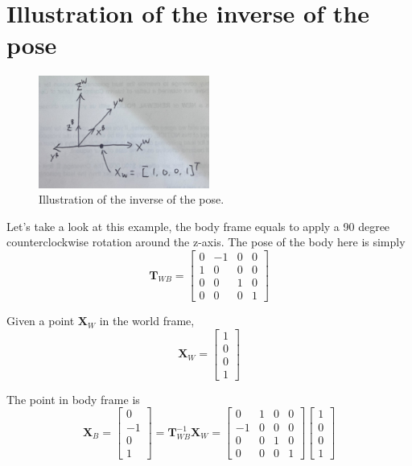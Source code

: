 \documentclass{article}
\begin{document}
\section{Illustration of the inverse of the pose}
\begin{figure}[h]
    \centering
    \includegraphics[width=0.5\textwidth]{figs/transform_1.jpg}
    \caption{Illustration of the inverse of the pose.}
    \label{fig:inverse_pose}
\end{figure}

Let's take a look at this example, the body frame equals to apply a 90 degree counterclockwise rotation around the z-axis. The pose of the body here is simply
\begin{equation}
    \mathbf{T}_{WB} = 
    \begin{bmatrix}
    0 & -1 & 0 & 0 \\
    1 & 0 & 0 & 0 \\
    0 & 0 & 1 & 0 \\
    0 & 0 & 0 & 1
    \end{bmatrix}
\end{equation}

Given a point $\mathbf{X}_W$ in the world frame,
\begin{equation}
    \mathbf{X}_W = 
    \begin{bmatrix}
    1 \\
    0 \\
    0 \\
    1
    \end{bmatrix}
\end{equation}

The point in body frame is
\begin{equation}
    \mathbf{X}_B = \begin{bmatrix}
        0 \\
        -1 \\
        0 \\
        1
    \end{bmatrix}
    = \mathbf{T}_{WB}^{-1} \mathbf{X}_W
    = 
    \begin{bmatrix}
        0 & 1 & 0 & 0 \\
        -1 & 0 & 0 & 0 \\
        0 & 0 & 1 & 0 \\
        0 & 0 & 0 & 1
    \end{bmatrix}
    \begin{bmatrix}
        1 \\
        0 \\
        0 \\
        1
    \end{bmatrix}
\end{equation}
\end{document}
